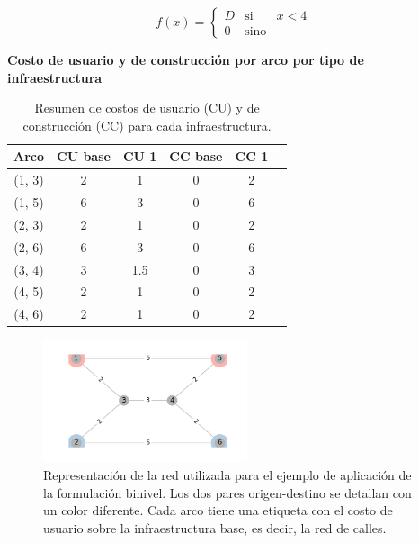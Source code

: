 \documentclass{article}
\begin{document}
  $$
    f(x) = \left\{ \begin{array}{lcr}
            D & \mbox{si}   & x < 4 \\
            0 & \mbox{sino} &
    \end{array}
    \right.
  $$

  \begin{table}[h!]
    \centering
      \caption*{{\bf Costo de usuario y de construcción por arco por tipo de infraestructura}}
    \begin{tabular}{cccccc}
      \toprule
      Arco & CU base & CU 1 & CC base & CC 1 & \\
      \midrule
        (1, 3) & 2 & 1   & 0 & 2 \\
        (1, 5) & 6 & 3   & 0 & 6 \\
        (2, 3) & 2 & 1   & 0 & 2 \\
        (2, 6) & 6 & 3   & 0 & 6 \\
        (3, 4) & 3 & 1.5 & 0 & 3 \\
        (4, 5) & 2 & 1   & 0 & 2 \\
        (4, 6) & 2 & 1   & 0 & 2 \\
      \bottomrule
    \end{tabular}
      \caption{Resumen de costos de usuario (CU) y de construcción (CC) para cada infraestructura.}\label{table:example1arccosts}
  \end{table}

  \begin{figure}[h!]
    \centering
    \includegraphics[width=6cm]{../resources/example_1_base.png}
    \caption{Representación de la red utilizada para el ejemplo de aplicación de la formulación binivel. Los dos pares origen-destino se detallan con un color diferente. Cada arco tiene una etiqueta con el costo de usuario sobre la infraestructura base, es decir, la red de calles.}
    \label{fig:example1base}
  \end{figure}
\end{document}

